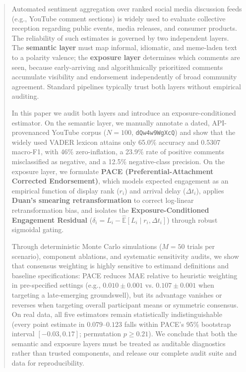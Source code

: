 \documentclass[journal]{IEEEtran}
\begin{document}
\begin{abstract}
Automated sentiment aggregation over ranked social media discussion feeds (e.g., YouTube comment sections) is widely used to evaluate collective reception regarding public events, media releases, and consumer products. The reliability of such estimates is governed by two independent layers. The \textbf{semantic layer} must map informal, idiomatic, and meme-laden text to a polarity valence; the \textbf{exposure layer} determines which comments are seen, because early-arriving and algorithmically prioritized comments accumulate visibility and endorsement independently of broad community agreement. Standard pipelines typically trust both layers without empirical auditing.

In this paper we audit both layers and introduce an exposure-conditioned estimator. On the semantic layer, we manually annotate a dated, API-provenanced YouTube corpus ($N = 100$, \texttt{dQw4w9WgXcQ}) and show that the widely used VADER lexicon attains only 65.0\% accuracy and 0.5307 macro-F1, with 46\% zero-inflation, a 23.9\% rate of positive comments misclassified as negative, and a 12.5\% negative-class precision. On the exposure layer, we formulate \textbf{PACE (Preferential-Attachment Corrected Endorsement)}, which models expected engagement as an empirical function of display rank ($r_i$) and arrival delay ($\Delta t_i$), applies \textbf{Duan's smearing retransformation} to correct log-linear retransformation bias, and isolates the \textbf{Exposure-Conditioned Engagement Residual} ($\delta_i = L_i - \hat{\mathbb{E}}[L_i \mid r_i, \Delta t_i]$) through robust sigmoidal gating.

Through deterministic Monte Carlo simulations ($M = 50$ trials per scenario), component ablations, and systematic sensitivity audits, we show that consensus weighting is highly sensitive to estimand definitions and baseline specifications: PACE reduces MAE relative to heuristic weighting in pre-specified settings (e.g., $0.010 \pm 0.001$ vs. $0.107 \pm 0.001$ when targeting a late-emerging groundswell), but its advantage vanishes or reverses when targeting overall participant means or symmetric consensus. On real data, all five estimators remain statistically indistinguishable (every point estimate in $0.079$--$0.123$ falls within PACE's 95\% bootstrap interval $[-0.03, 0.17]$; permutation $p \ge 0.21$). We conclude that both the semantic and exposure layers must be treated as auditable diagnostics rather than trusted components, and release our complete audit suite and data for reproducibility.
\end{abstract}
\end{document}
